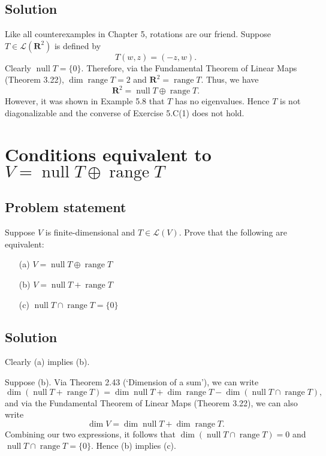 \documentclass{article}
\begin{document}
\subsection*{Solution}
Like all counterexamples in Chapter 5, rotations are our friend.
Suppose $T\in\mathcal{L}(\mathbf{R}^2)$ is defined by
\[T(w,z)=(-z,w).\]
Clearly $\operatorname{null}T=\{0\}$. 
Therefore, via the Fundamental Theorem of Linear Maps (Theorem 3.22), $\operatorname{dim}\operatorname{range}T=2$ and $\mathbf{R}^2=\operatorname{range}T$. 
Thus, we have 
\[\mathbf{R}^2=\operatorname{null}T\oplus\operatorname{range}T.\]
However, it was shown in Example 5.8 that $T$ has no eigenvalues. 
Hence $T$ is not diagonalizable and the converse of Exercise 5.C(1) does not hold.

\clearpage

\section{Conditions equivalent to $V=\operatorname{null}T\oplus\operatorname{range}T$}
\subsection*{Problem statement}
Suppose $V$ is finite-dimensional and $T\in\mathcal{L}(V)$. 
Prove that the following are equivalent:
\begin{itemize}
    \item[(a)] $V=\operatorname{null}T\oplus\operatorname{range}T$
    \item[(b)] $V=\operatorname{null}T+\operatorname{range}T$
    \item[(c)] $\operatorname{null}T\cap \operatorname{range}T=\{0\}$
\end{itemize}

\subsection*{Solution}
Clearly (a) implies (b). 

Suppose (b). 
Via Theorem 2.43 (`Dimension of a sum'), we can write
\[\dim(\operatorname{null}T+\operatorname{range}T)=\dim\operatorname{null}T+\dim\operatorname{range}T-\dim(\operatorname{null}T\cap \operatorname{range}T),\]
and via the Fundamental Theorem of Linear Maps (Theorem 3.22), we can also write
\[\dim V=\dim\operatorname{null}T+\dim\operatorname{range}T.\]
Combining our two expressions, it follows that $\dim(\operatorname{null}T\cap \operatorname{range}T)=0$ and $\operatorname{null}T\cap \operatorname{range}T=\{0\}$. Hence (b) implies (c).
\end{document}
